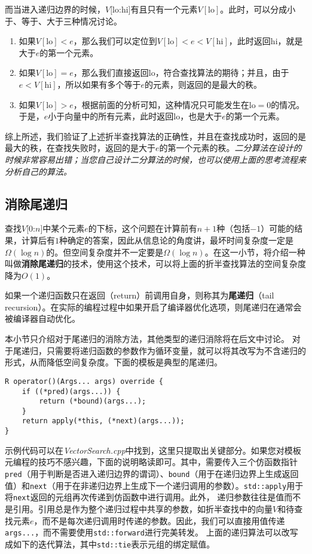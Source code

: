 而当进入递归边界的时候，$V[\mathrm{lo}$:$\mathrm{hi}]$有且只有一个元素$V[\mathrm{lo}]$。此时，可以分成小于、等于、大于三种情况讨论。
\begin{enumerate}
    \item 如果$V[\mathrm{lo}] < e$，那么我们可以定位到$V[\mathrm{lo}] < e < V[\mathrm{hi}]$，此时返回$\mathrm{hi}$，就是大于$e$的第一个元素。
    \item 如果$V[\mathrm{lo}] = e$，那么我们直接返回$\mathrm{lo}$，符合查找算法的期待；并且，由于$e < V[\mathrm{hi}]$，所以如果有多个等于$e$的元素，则返回的是最大的秩。
    \item 如果$V[\mathrm{lo}] > e$，根据前面的分析可知，这种情况只可能发生在$\mathrm{lo} = 0$的情况。于是，$e$小于向量中的所有元素，此时返回$\mathrm{lo}$，也是大于$e$的第一个元素。
\end{enumerate}

综上所述，我们验证了上述折半查找算法的正确性，并且在查找成功时，返回的是最大的秩，在查找失败时，返回的是大于$e$的第一个元素的秩。\textit{二分算法在设计的时候非常容易出错；当您自己设计二分算法的时候，也可以使用上面的思考流程来分析自己的算法。}

\subsection{消除尾递归}
\label{vec:消除简单尾递归}
查找$V[0$:$n]$中某个元素$e$的下标，这个问题在计算前有$n+1$种（包括$-1$）可能的结果，计算后有$1$种确定的答案，因此从信息论的角度讲，最坏时间复杂度一定是$\Omega(\log n)$的。但空间复杂度并不一定要是$\Omega (\log n)$。在这一小节，将介绍一种叫做\textbf{消除尾递归}的技术，使用这个技术，可以将上面的折半查找算法的空间复杂度降为$O(1)$。

如果一个递归函数只在返回（return）前调用自身，则称其为\textbf{尾递归}（tail recursion）。在实际的编程过程中如果开启了编译器优化选项，则尾递归在通常会被编译器自动优化。

本小节只介绍对于尾递归的消除方法，其他类型的递归消除将在后文中讨论。
对于尾递归，只需要将递归函数的参数作为循环变量，就可以将其改写为不含递归的形式，从而降低空间复杂度。下面的模板是典型的尾递归。

\begin{lstlisting}
R operator()(Args... args) override {
    if ((*pred)(args...)) {
        return (*bound)(args...);
    }
    return apply(*this, (*next)(args...));
}
\end{lstlisting}

示例代码可以在\textit{VectorSearch.cpp}中找到，这里只提取出关键部分。如果您对模板元编程的技巧不感兴趣，下面的说明略读即可。其中，需要传入三个仿函数指针\lstinline{pred}（用于判断是否进入递归边界的谓词）、\lstinline{bound}（用于在递归边界上生成返回值）和\lstinline{next}（用于在非递归边界上生成下一个递归调用的参数）。\lstinline{std::apply}用于将\lstinline{next}返回的元组再次传递到仿函数中进行调用。此外，
递归参数往往是值而不是引用。引用总是作为整个递归过程中共享的参数，如折半查找中的向量$V$和待查找元素$e$，而不是每次递归调用时传递的参数。因此，我们可以直接用值传递\lstinline{args...}，而不需要使用\lstinline{std::forward}进行完美转发。
上面的递归算法可以改写成如下的迭代算法，其中\lstinline{std::tie}表示元组的绑定赋值。

